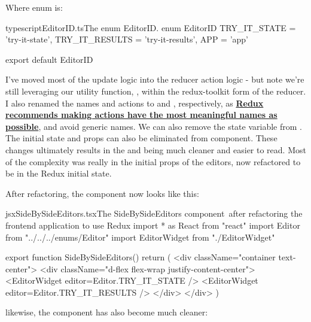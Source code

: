\documentclass[a4paper,headinclude=on,footinclude=on,12pt,oneside]{scrbook}
\newcommand{\link}[2]{\textbf{\textcolor{monokaiPink}{\href{#2}{#1}}}}
\begin{document}
Where enum  is:

\begin{codeInput}{typescript}{EditorID.ts}{The enum EditorID.}
enum EditorID {
  TRY_IT_STATE = 'try-it-state',
  TRY_IT_RESULTS = 'try-it-results',
  APP = 'app'
}

export default EditorID
\end{codeInput}

I've moved most of the  update logic into the reducer action logic - but note we're still leveraging our utility function, , within the redux-toolkit form of the reducer. I also renamed the names  and  actions to  and , respectively, as \link{Redux recommends making actions have the most meaningful names as possible}{https://redux.js.org/style-guide/style-guide\#write-meaningful-action-names}, and avoid generic names. We can also remove the state variable from . The initial state and props can also be eliminated from  component. These changes ultimately results in the  and  being much cleaner and easier to read. Most of the complexity was really in the initial props of the editors, now refactored to be in the Redux initial state.

After refactoring, the  component now looks like this:

\begin{codeInput}{jsx}{SideBySideEditors.tsx}{The SideBySideEditors component\, after refactoring the frontend application to use Redux}
import * as React from "react"
import Editor from "../../../enums/Editor"
import { EditorWidget } from "./EditorWidget"

export function SideBySideEditors() {
  return (
    <div className="container text-center">
      <div className="d-flex flex-wrap justify-content-center">
        <EditorWidget editor={Editor.TRY_IT_STATE} />
        <EditorWidget editor={Editor.TRY_IT_RESULTS} />
      </div>
    </div>
  )
}
\end{codeInput}

likewise, the  component has also become much cleaner:

\end{document}
